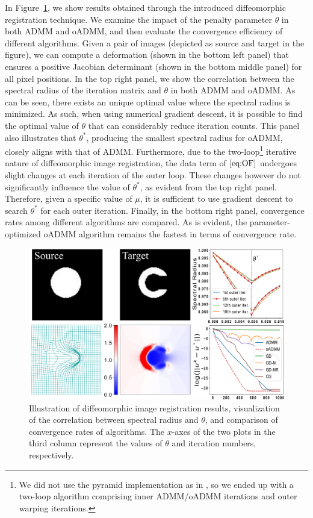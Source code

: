 \documentclass[letterpaper]{article} %
\begin{document}
In Figure~\ref{fig:4}, we show results obtained through the introduced diffeomorphic registration technique. We examine the impact of the penalty parameter $\theta$ in both ADMM and oADMM, and then evaluate the convergence efficiency of different algorithms. Given a pair of images (depicted as source and target in the figure), we can compute a deformation (shown in the bottom left panel) that ensures a positive Jacobian determinant (shown in the bottom middle panel) for all pixel positions. In the top right panel, we show the correlation between the spectral radius of the iteration matrix and $\theta$ in both ADMM and oADMM. As can be seen, there exists an unique optimal value where the spectral radius is minimized. As such, when using numerical gradient descent, it is possible to find the optimal value of $\theta$ that can considerably reduce iteration counts. This panel also illustrates that $\theta^*$, producing the smallest spectral radius for oADMM, closely aligns with that of ADMM. Furthermore, due to the two-loop\footnote{We did not use the pyramid implementation as in \cite{thorley2021nesterov}, so we ended up with a two-loop algorithm comprising inner ADMM/oADMM iterations and outer warping iterations.} iterative nature of diffeomorphic image registration, the data term of $\eqref{eq:OF}$ undergoes slight changes at each iteration of the outer loop. These changes however do not significantly influence the value of $\theta^*$, as evident from the top right panel. Therefore, given a specific value of $\mu$, it is sufficient to use gradient descent to search $\theta^*$ for each outer iteration. Finally, in the bottom right panel, convergence rates among different algorithms are compared. As is evident, the parameter-optimized oADMM algorithm remains the fastest in terms of convergence rate.
\begin{figure}[t]
	\centering
   \includegraphics[width=0.98\linewidth]{Figures/n13.pdf}
	\caption{ Illustration of diffeomorphic image registration results, visualization of the correlation between spectral radius and $\theta$, and comparison of convergence rates of algorithms. The $x$-axes of the two plots in the third column represent the values of $\theta$ and iteration numbers, respectively.}
	\label{fig:4}
\end{figure}
\end{document}
